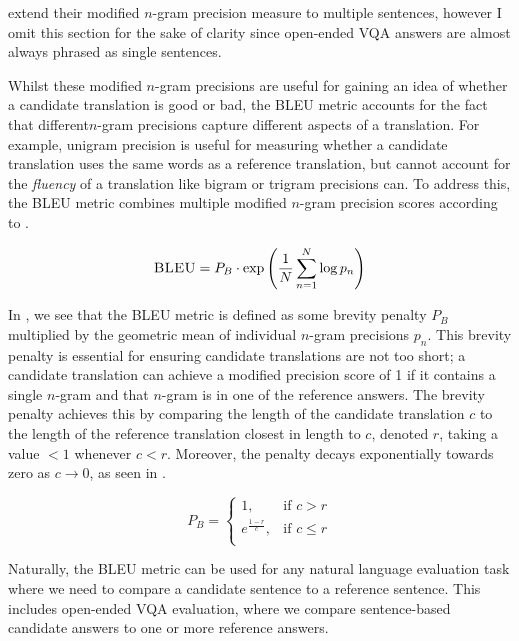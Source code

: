 \cite{papineni2002bleu} extend their modified \(n\)-gram precision measure to multiple sentences, however I omit this section for the sake of clarity since open-ended VQA answers are almost always phrased as single sentences.

Whilst these modified \(n\)-gram precisions are useful for gaining an idea of whether a candidate translation is good or bad, the BLEU metric accounts for the fact that different\(n\)-gram precisions capture different aspects of a translation. For example, unigram precision is useful for measuring whether a candidate translation uses the same words as a reference translation, but cannot account for the \textit{fluency} of a translation like bigram or trigram precisions can. To address this, the BLEU metric combines multiple modified \(n\)-gram precision scores according to \equationautorefname{ \ref{equation:bleu_metric}}.

\begin{equation}
    \textsc{BLEU} = P_B \cdot \exp \left(\frac{1}{N} \sum_{n=1}^N \log p_n\right)
    \label{equation:bleu_metric}
\end{equation}

In \equationautorefname{ \ref{equation:bleu_metric}}, we see that the BLEU metric is defined as some brevity penalty \(P_B\) multiplied by the geometric mean of individual \(n\)-gram precisions \(p_n\). This brevity penalty is essential for ensuring candidate translations are not too short; a candidate translation can achieve a modified precision score of 1 if it contains a single \(n\)-gram and that \(n\)-gram is in one of the reference answers. The brevity penalty achieves this by comparing the length of the candidate translation \(c\) to the length of the reference translation closest in length to \(c\), denoted \(r\), taking a value \(< 1\) whenever \(c < r\). Moreover, the penalty decays exponentially towards zero as \(c \rightarrow 0\), as seen in \equationautorefname{ \ref{equation:bleu_brevity_penalty}}.

\begin{equation}
    P_B = \begin{cases}
    1, &\text{if } c > r\\
    e^{\frac{1-r}{c}}, &\text{if } c \leq r\\
    \end{cases}
    \label{equation:bleu_brevity_penalty}
\end{equation}

Naturally, the BLEU metric can be used for any natural language evaluation task where we need to compare a candidate sentence to a reference sentence. This includes open-ended VQA evaluation, where we compare sentence-based candidate answers to one or more reference answers.

